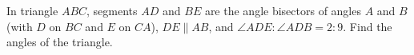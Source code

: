 In triangle $ABC$, segments $AD$ and $BE$ are the angle bisectors of angles $A$ and $B$ (with $D$ on $BC$ and $E$ on $CA$), $DE\parallel AB$, and $\angle ADE:\angle ADB=2:9$. Find the angles of the triangle.
